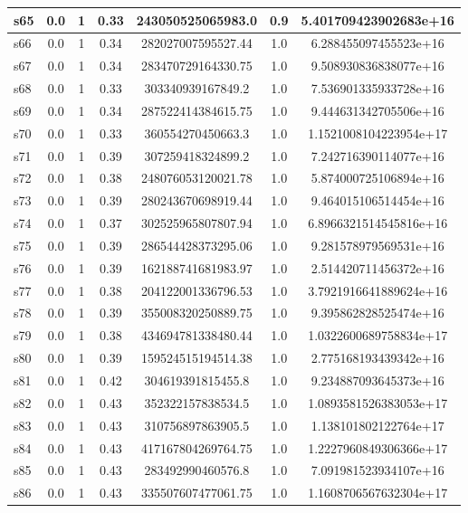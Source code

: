 \documentclass{article}
\begin{document}
\begin{tabular}{|l|c|c|c|c|c|c|}
\hline
s65 &0.0 & 1 & 0.33 & 243050525065983.0 & 0.9 & 5.401709423902683e+16\\
\hline
s66 &0.0 & 1 & 0.34 & 282027007595527.44 & 1.0 & 6.288455097455523e+16\\
\hline
s67 &0.0 & 1 & 0.34 & 283470729164330.75 & 1.0 & 9.508930836838077e+16\\
\hline
s68 &0.0 & 1 & 0.33 & 303340939167849.2 & 1.0 & 7.536901335933728e+16\\
\hline
s69 &0.0 & 1 & 0.34 & 287522414384615.75 & 1.0 & 9.444631342705506e+16\\
\hline
s70 &0.0 & 1 & 0.33 & 360554270450663.3 & 1.0 & 1.1521008104223954e+17\\
\hline
s71 &0.0 & 1 & 0.39 & 307259418324899.2 & 1.0 & 7.242716390114077e+16\\
\hline
s72 &0.0 & 1 & 0.38 & 248076053120021.78 & 1.0 & 5.874000725106894e+16\\
\hline
s73 &0.0 & 1 & 0.39 & 280243670698919.44 & 1.0 & 9.464015106514454e+16\\
\hline
s74 &0.0 & 1 & 0.37 & 302525965807807.94 & 1.0 & 6.8966321514545816e+16\\
\hline
s75 &0.0 & 1 & 0.39 & 286544428373295.06 & 1.0 & 9.281578979569531e+16\\
\hline
s76 &0.0 & 1 & 0.39 & 162188741681983.97 & 1.0 & 2.514420711456372e+16\\
\hline
s77 &0.0 & 1 & 0.38 & 204122001336796.53 & 1.0 & 3.7921916641889624e+16\\
\hline
s78 &0.0 & 1 & 0.39 & 355008320250889.75 & 1.0 & 9.395862828525474e+16\\
\hline
s79 &0.0 & 1 & 0.38 & 434694781338480.44 & 1.0 & 1.0322600689758834e+17\\
\hline
s80 &0.0 & 1 & 0.39 & 159524515194514.38 & 1.0 & 2.775168193439342e+16\\
\hline
s81 &0.0 & 1 & 0.42 & 304619391815455.8 & 1.0 & 9.234887093645373e+16\\
\hline
s82 &0.0 & 1 & 0.43 & 352322157838534.5 & 1.0 & 1.0893581526383053e+17\\
\hline
s83 &0.0 & 1 & 0.43 & 310756897863905.5 & 1.0 & 1.138101802122764e+17\\
\hline
s84 &0.0 & 1 & 0.43 & 417167804269764.75 & 1.0 & 1.2227960849306366e+17\\
\hline
s85 &0.0 & 1 & 0.43 & 283492990460576.8 & 1.0 & 7.091981523934107e+16\\
\hline
s86 &0.0 & 1 & 0.43 & 335507607477061.75 & 1.0 & 1.1608706567632304e+17\\

\end{tabular}
\end{document}
